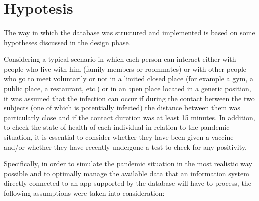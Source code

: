 \documentclass[a4paper,12pt]{article}
\begin{document}
\section{Hypotesis}
\paragraph{} The way in which the database was structured and implemented is based on some hypotheses discussed in the design phase. \par Considering a typical scenario in which each person can interact either with people who live with him (family members or roommates) or with other people who go to meet voluntarily or not in a limited closed place (for example a gym, a public place, a restaurant, etc.) or in an open place located in a generic position, it was assumed that the infection can occur if during the contact between the two subjects (one of which is potentially infected) the distance between them was particularly close and if the contact duration was at least 15 minutes. In addition, to check the state of health of each individual in relation to the pandemic situation, it is essential to consider whether they have been given a vaccine and/or whether they have recently undergone a test to check for any positivity. \par
Specifically, in order to simulate the pandemic situation in the most realistic way possible and to optimally manage the available data that an information system directly connected to an app supported by the database will have to process, the following assumptions were taken into consideration:
\end{document}
